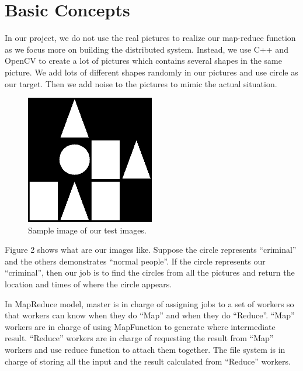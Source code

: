 \documentclass[12pt]{article}
\begin{document}
\section {Basic Concepts}

In our project, we do not use the real pictures to realize our map-reduce function as we focus more on building the distributed system. Instead,
we use C++ and OpenCV to create a lot of pictures which contains several shapes in the same picture. We add lots of different shapes randomly in our pictures and use circle as our target. Then we add noise to the pictures to mimic the actual situation.

\begin{figure}[h!]
  
  \centering
    \includegraphics[width=0.5\textwidth]{1.jpg}
    \caption{Sample image of our test images.}
\end{figure}

Figure 2 shows what are our images like. Suppose the circle represents “criminal” and the others demonstrates “normal people”. If the circle represents our “criminal”, then our job is to find the circles from all the pictures and return the location and times of where the circle appears. 

In MapReduce model, master is in charge of assigning jobs to a set of workers so that workers can know when they do “Map” and when they do “Reduce”. “Map” workers are in charge of using MapFunction to generate where intermediate result.  “Reduce” workers are in charge of requesting the result from “Map” workers and use reduce function to attach them together. The file system is in charge of storing all the input and the result calculated from “Reduce” workers.
\end{document}
